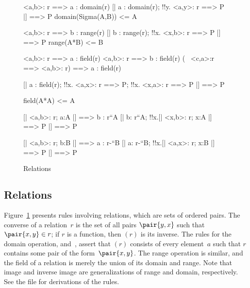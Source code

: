 
\begin{figure}
\begin{ttbox}
        <a,b>: r ==> a : domain(r)
        [| a : domain(r);  !!y. <a,y>: r ==> P |] ==> P
  domain(Sigma(A,B)) <= A

         <a,b>: r ==> b : range(r)
         [| b : range(r);  !!x. <x,b>: r ==> P |] ==> P
   range(A*B) <= B

        <a,b>: r ==> a : field(r)
        <a,b>: r ==> b : field(r)
        (~ <c,a>:r ==> <a,b>: r) ==> a : field(r)

         [| a : field(r);  
                  !!x. <a,x>: r ==> P;  
                  !!x. <x,a>: r ==> P      
               |] ==> P

   field(A*A) <= A

         [| <a,b>: r;  a:A |] ==> b : r``A
         [| b: r``A;  !!x.[| <x,b>: r;  x:A |] ==> P |] ==> P

        [| <a,b>: r;  b:B |] ==> a : r-``B
        [| a: r-``B;  !!x.[| <a,x>: r;  x:B |] ==> P |] ==> P
\end{ttbox}
\caption{Relations} \label{ZF-domrange}
\end{figure}


\subsection{Relations}
Figure~\ref{ZF-domrange} presents rules involving relations, which are sets
of ordered pairs.  The converse of a relation~$r$ is the set of all pairs
$\pair{y,x}$ such that $\pair{x,y}\in r$; if $r$ is a function, then
{$(r)$} is its inverse.  The rules for the domain
operation,  and~, assert that
$(r)$ consists of every element~$a$ such that $r$ contains
some pair of the form~$\pair{x,y}$.  The range operation is similar, and
the field of a relation is merely the union of its domain and range.  Note
that image and inverse image are generalizations of range and domain,
respectively.  See the file
 for derivations of the rules.



